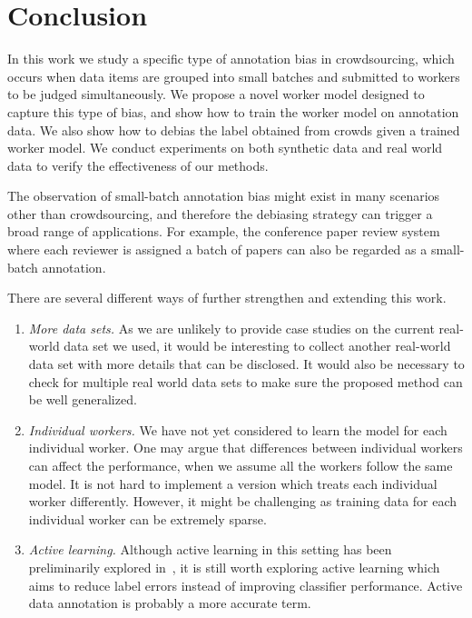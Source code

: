 \section{Conclusion}
\label{sec:conclusion}

In this work we study a specific type of annotation bias in crowdsourcing, 
which occurs when data items are grouped into small batches 
and submitted to workers to be judged simultaneously.  
We propose a novel worker model designed to capture this type of bias, 
and show how to train the worker model on annotation data.  
We also show how to debias the label obtained from crowds given a trained worker model.  
We conduct experiments on both synthetic data and real world data to verify the effectiveness of our methods.  

The observation of small-batch annotation bias might exist in many scenarios other than crowdsourcing, 
and therefore the debiasing strategy can trigger a broad range of applications. 
For example, the conference paper review system where each reviewer is assigned a batch of papers 
can also be regarded as a small-batch annotation.  

There are several different ways of further strengthen and extending this work.  
\begin{enumerate}
  \item \emph{More data sets.}
        As we are unlikely to provide case studies on the current real-world data set we used,
        it would be interesting to collect another real-world data set with more details that can be disclosed.  
        It would also be necessary to check for multiple real world data sets to make sure the proposed method can be well generalized.  
  \item \emph{Individual workers.}
        We have not yet considered to learn the model for each individual worker.  
        One may argue that differences between individual workers can affect the performance, 
        when we assume all the workers follow the same model.  
        It is not hard to implement a version which treats each individual worker differently.  
        However, it might be challenging as training data for each individual worker can be extremely sparse.  
  \item \emph{Active learning.}
        Although active learning in this setting has been preliminarily explored in~\cite{zhuang:wsdm2015}, 
        it is still worth exploring active learning which aims to reduce label errors instead of improving classifier performance.  
        Active data annotation is probably a more accurate term.  
\end{enumerate} 